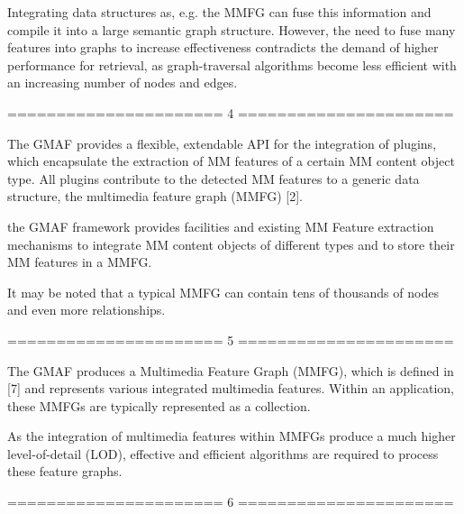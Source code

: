 Integrating data
structures as, e.g. the MMFG can fuse this information and
compile it into a large semantic graph structure. However,
the need to fuse many features into graphs to increase effectiveness
contradicts the demand of higher performance for
retrieval, as graph-traversal algorithms become less efficient
with an increasing number of nodes and edges.

====================== 4
======================

The GMAF provides a flexible, extendable API for the integration of plugins, which
encapsulate the extraction of MM features of a certain MM content object type. All plugins
contribute to the detected MM features to a generic data structure, the multimedia feature
graph (MMFG) [2].

the GMAF framework provides facilities
and existing MM Feature extraction mechanisms to integrate MM content objects of
different types and to store their MM features in a MMFG.

It may be noted that a typical
MMFG can contain tens of thousands of nodes and even more relationships.

====================== 5
======================

The GMAF produces a Multimedia Feature Graph (MMFG), which is defined in [7] and
represents various integrated multimedia features. Within an application, these MMFGs
are typically represented as a collection.

As the integration of multimedia features within MMFGs produce a much higher
level-of-detail (LOD), effective and efficient algorithms are required to process these feature
graphs.

====================== 6
======================